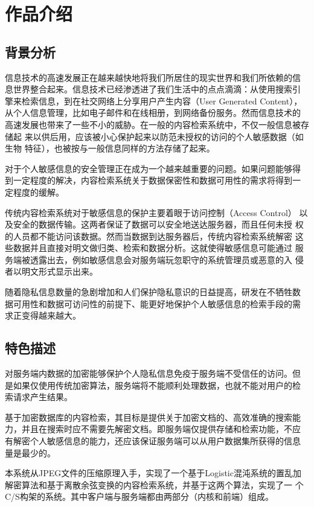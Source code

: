 
\chapter{作品介绍}
\label{chap:intro}

\section{背景分析}
\label{sec:bkg-analysis}

信息技术的高速发展正在越来越快地将我们所居住的现实世界和我们所依赖的信
息世界整合起来。信息技术已经渗透进了我们生活中的点点滴滴：从使用搜索引
擎来检索信息，到在社交网络上分享用户产生内容（User Generated Content），
从个人信息管理，比如电子邮件和在线相册，到网络备份服务。然而信息技术的
高速发展也带来了一些不小的威胁。在一般的内容检索系统中，不仅一般信息被存储起
来以供后用，应该被小心保护起来以防范未授权的访问的个人敏感数据（如生物
特征），也被按与一般信息同样的方法存储了起来。

对于个人敏感信息的安全管理正在成为一个越来越重要的问题。如果问题能够得
到一定程度的解决，内容检索系统关于数据保密性和数据可用性的需求将得到一
定程度的缓解。

传统内容检索系统对于敏感信息的保护主要着眼于访问控制（Access Control）
以及安全的数据传输。这两者保证了数据可以安全地送达服务器，而且任何未授
权的人员都不能访问该数据。然而当数据到达服务器后，传统内容检索系统解密
这些数据并且直接对明文做归类、检索和数据分析。这就使得敏感信息可能通过
服务端被透露出去，例如敏感信息会对服务端玩忽职守的系统管理员或恶意的入
侵者以明文形式显示出来。

随着隐私信息数量的急剧增加和人们保护隐私意识的日益提高，研发在不牺牲数
据可用性和数据可访问性的前提下、能更好地保护个人敏感信息的检索手段的需
求正变得越来越大。

\section{特色描述}
\label{sec:spec-description}

对服务端内数据的加密能够保护个人隐私信息免疫于服务端不受信任的访问。但
是如果仅使用传统加密算法，服务端将不能顺利处理数据，也就不能对用户的检
索请求产生结果。

基于加密数据库的内容检索，其目标是提供关于加密文档的、高效准确的搜索能
力，并且在搜索时应不需要先解密文档。即服务端仅提供存储和检索功能，不应
有解密个人敏感信息的能力，还应该保证服务端可以从用户数据集所获得的信息
量是最少的。

本系统从JPEG文件的压缩原理入手，实现了一个基于Logistic混沌系统的置乱加
解密算法和基于离散余弦变换的内容检索系统，并基于这两个算法，实现了一
个C/S构架的系统。其中客户端与服务端都由两部分（内核和前端）组成。


